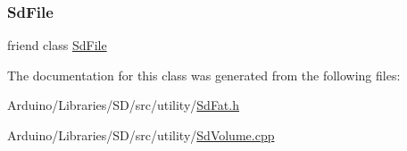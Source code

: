 \subsubsection{\texorpdfstring{Sd\+File}{SdFile}}
{\footnotesize\ttfamily friend class \hyperlink{class_sd_file}{Sd\+File}\hspace{0.3cm}{\ttfamily [friend]}}



The documentation for this class was generated from the following files\+:\begin{DoxyCompactItemize}
\item 
Arduino/\+Libraries/\+S\+D/src/utility/\hyperlink{_sd_fat_8h}{Sd\+Fat.\+h}\item 
Arduino/\+Libraries/\+S\+D/src/utility/\hyperlink{_sd_volume_8cpp}{Sd\+Volume.\+cpp}\end{DoxyCompactItemize}
